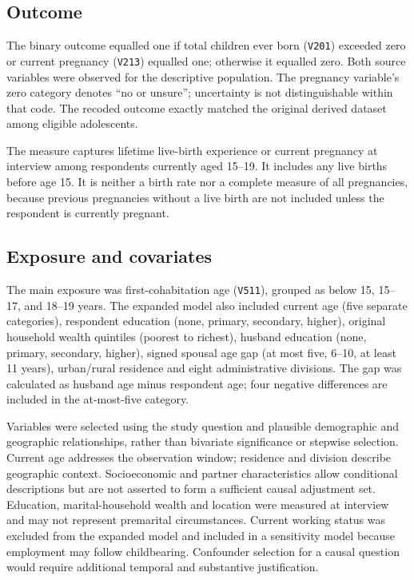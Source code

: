 \documentclass[11pt]{article}
\begin{document}
\subsection{Outcome}
The binary outcome equalled one if total children ever born (\texttt{V201}) exceeded zero or current pregnancy (\texttt{V213}) equalled one; otherwise it equalled zero. Both source variables were observed for the descriptive population. The pregnancy variable's zero category denotes ``no or unsure''; uncertainty is not distinguishable within that code. The recoded outcome exactly matched the original derived dataset among eligible adolescents.

The measure captures lifetime live-birth experience or current pregnancy at interview among respondents currently aged 15--19. It includes any live births before age 15. It is neither a birth rate nor a complete measure of all pregnancies, because previous pregnancies without a live birth are not included unless the respondent is currently pregnant.

\subsection{Exposure and covariates}
The main exposure was first-cohabitation age (\texttt{V511}), grouped as below 15, 15--17, and 18--19 years. The expanded model also included current age (five separate categories), respondent education (none, primary, secondary, higher), original household wealth quintiles (poorest to richest), husband education (none, primary, secondary, higher), signed spousal age gap (at most five, 6--10, at least 11 years), urban/rural residence and eight administrative divisions. The gap was calculated as husband age minus respondent age; four negative differences are included in the at-most-five category.

Variables were selected using the study question and plausible demographic and geographic relationships, rather than bivariate significance or stepwise selection. Current age addresses the observation window; residence and division describe geographic context. Socioeconomic and partner characteristics allow conditional descriptions but are not asserted to form a sufficient causal adjustment set. Education, marital-household wealth and location were measured at interview and may not represent premarital circumstances. Current working status was excluded from the expanded model and included in a sensitivity model because employment may follow childbearing. Confounder selection for a causal question would require additional temporal and substantive justification.\cite{vanderweele,schisterman}
\end{document}
